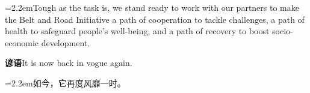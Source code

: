 \documentclass[11pt,a4paper]{article}
\newcommand{\num}[1]{\makebox[1.9em][r]{#1.}\hspace{0.3em}}
\begin{document}
\vspace{0.15em}

\noindent\hangindent=2.2em\hspace{2.2em}Tough as the task is, we stand ready to work with our partners to make the Belt and Road Initiative a path of cooperation to tackle challenges, a path of health to safeguard people’s well-being, and a path of recovery to boost socio-economic development.

\vspace{0.4em}\noindent{\color{rulegray}\rule{\textwidth}{0.6pt}}\vspace{0.4em}

\num{5}\textbf{谚语}\quad It is now back in vogue again.

\vspace{0.15em}

\noindent\hangindent=2.2em\hspace{2.2em}如今，它再度风靡一时。
\end{document}
